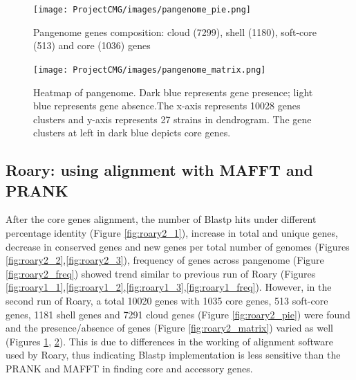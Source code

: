 \documentclass[11pt]{article}
\begin{document}
\begin{figure}
    \centering
     \texttt{[image: ProjectCMG/images/pangenome\_pie.png]}
     \caption{Pangenome genes composition: cloud (7299), shell (1180), soft-core (513) and core (1036) genes}\label{fig:roary1_pie}
\end{figure}

\begin{figure}[h!]
    \centering
    \texttt{[image: ProjectCMG/images/pangenome\_matrix.png]}
    \caption{Heatmap of pangenome. Dark blue represents gene presence; light blue represents gene absence.The x-axis represents 10028 genes clusters and y-axis represents 27 strains in dendrogram. The gene clusters at left in dark blue depicts core genes.}
    \label{fig:roary1_matrix}
\end{figure}

\subsection{Roary: using alignment with MAFFT and PRANK }

After the core genes alignment, the number of Blastp hits under different percentage identity (Figure \ref{fig:roary2_1}), increase in total and unique genes, decrease in conserved genes and new genes per total number of genomes (Figures \ref{fig:roary2_2},\ref{fig:roary2_3}), frequency of genes across pangenome (Figure \ref{fig:roary2_freq}) showed trend similar to previous run of Roary (Figures \ref{fig:roary1_1},\ref{fig:roary1_2},\ref{fig:roary1_3},\ref{fig:roary1_freq}). However, in the second run of Roary, a total 10020 genes with 1035 core genes, 513 soft-core genes, 1181 shell genes and 7291 cloud genes (Figure \ref{fig:roary2_pie}) were found and the presence/absence of genes (Figure \ref{fig:roary2_matrix}) varied as well (Figures \ref{fig:roary1_pie}, \ref{fig:roary1_matrix}).
\newpage
This is due to differences in the working of alignment software used by Roary, thus indicating Blastp implementation is less sensitive than the PRANK and MAFFT in finding core and accessory genes.\\
\end{document}
